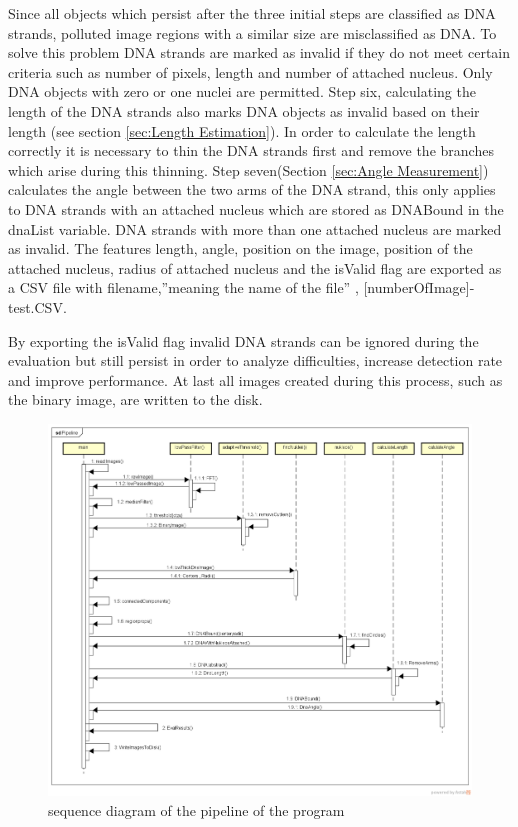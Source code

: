 \documentclass{article}
\begin{document}
Since all objects which persist after the three initial steps are classified as DNA strands, polluted image regions with a similar size are misclassified as DNA.
To solve this problem DNA strands are marked as invalid if they do not meet certain criteria such as number of pixels, length and number of attached nucleus.
Only DNA objects with zero or one nuclei are permitted.
Step six, calculating the length of the DNA strands also marks DNA objects as invalid based on their length (see section \ref{sec:Length Estimation}).
In order to calculate the length correctly it is necessary to thin the DNA strands first and remove the branches which arise during this thinning.
Step seven(Section \ref{sec:Angle Measurement})  calculates the angle between the two arms of the DNA strand, this only applies to DNA strands with an attached nucleus which are stored as DNABound in the dnaList variable.
DNA strands with more than one attached nucleus are marked as invalid.
The features length, angle, position on the image, position of the attached nucleus, radius of attached nucleus and the isValid flag are exported as a CSV file with filename,''meaning the name of the file''  \cite{UBHD-67466516},  [numberOfImage]-test.CSV.


By exporting the isValid flag invalid DNA strands can be ignored during the evaluation but still persist in order to analyze difficulties, increase detection rate and improve performance.
At last all images created during this process, such as the binary image, are written to the disk.


\begin{figure} [!ht]
	
	\includegraphics[width=1\linewidth]{Pipeline.png}
	
	\caption{sequence diagram of the pipeline of the program} %
	\label{fig:PipelineDiagram} 
\end{figure}
\end{document}

